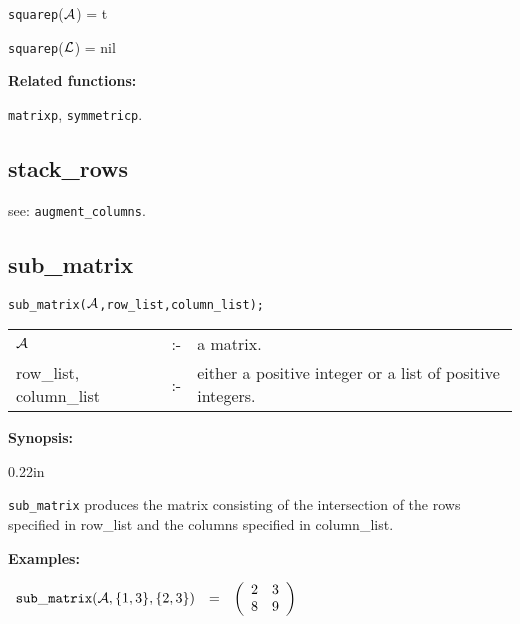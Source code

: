 \hspace*{0.175in} {\tt squarep}(${\cal A}$) = t 

\hspace*{0.175in} {\tt squarep}(${\cal L}$) = nil

{\bf Related functions:}

\hspace*{0.175in} {\tt matrixp}, {\tt symmetricp}.


\subsection{stack\_rows}

\hspace*{0.175in} see: {\tt augment\_columns}.


\subsection{sub\_matrix}


\hspace*{0.175in} {\tt sub\_matrix(${\cal A}$,row\_list,column\_list);}

\hspace*{0.1in}  
\begin{tabular}{l l l} 
${\cal A}$              &:-& a matrix. \\
row\_list, column\_list &:-& \parbox[t]{.605\linewidth}{either a 
positive integer or a list of positive integers.}
\end{tabular}

{\bf Synopsis:} %


\begin{addtolength}{\leftskip}{0.22in}

{\tt sub\_matrix} produces the matrix consisting of the
              intersection of the rows specified in row\_list and the 
columns specified in column\_list. 

\end{addtolength}

{\bf Examples:}

\begin{flushleft}  
\hspace*{0.1in}
\begin{math}  
\begin{array}{ccc}
{\tt sub\_matrix}({\cal A},\{1,3\},\{2,3\}) & = & 
        \left( \begin{array}{cc} 2 & 3 \\ 8 & 9
 \end{array} \right) 
\end{array}
\end{math}  
\end{flushleft}

